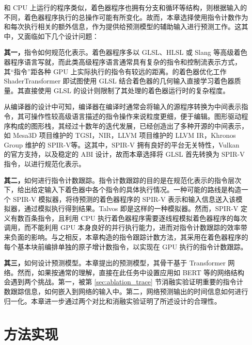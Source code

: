 {\amend 和 CPU 上运行的程序类似，着色器程序也拥有分支和循环等结构，则根据输入的不同，着色器程序执行的总操作可能有所变化。故而，本章选择使用指令计数作为和每次执行相关的额外信息，作为提供给预测模型的辅助输入进行预测工作。这其中，又面临如下几个设计问题：

{\bf 其一，}指令如何规范化表示。着色器程序多以 GLSL、HLSL 或 Slang 等高级着色器程序语言写就，而此类高级程序语言通常具有复杂的指令和控制流表示方式，其“指令”距各种 GPU 上实际执行的指令有较远的距离。\citet{10.1145/3528233.3530722}的着色器优化工作 ShaderTransformer 即试图使用 GLSL 结合着色器的几何输入直接学习着色器质量。其直接使用 GLSL 的设计则限制了其处理的着色器运行时的复杂程度。

从编译器的设计中可知，编译器在编译时通常会将输入的源程序转换为中间表示指令，其可操作性较高级语言描述的指令操作来说粒度更细，便于编辑。图形驱动程序构成的图形栈，其经过十数年的迭代发展，已经创造出了多种开源的中间表示，如 Mesa3D 项目维护的 TGSI\cite{TGSI}，NIR\cite{NIR}，LLVM 项目维护的 LLVM IR\cite{LLVMIR}，Khronos Group 维护的 SPIR-V\cite{SPIRV}等。这其中，SPIR-V 拥有良好的平台无关特性，Vulkan 的官方支持，以及稳定的 ABI 设计，故而本章选择将 GLSL 首先转换为 SPIR-V 指令，以进行规范化表示。

{\bf 其二，}如何进行指令计数跟踪。指令计数跟踪的目的是在规范化表示的指令层次下，给出给定输入下着色器中各个指令的具体执行情况。一种可能的路线是构造一个 SPIR-V 模拟器，将待预测的着色器程序的 SPIR-V 表示和输入信息送入该模拟器，通过模拟执行得到结果。Talvos \cite{Talvos}即是这样的一种模拟器。然而，SPIR-V 定义有数百条指令，且利用 CPU 执行着色器程序需要逐线程模拟着色器程序的每次调用，而不能利用 GPU 本身良好的并行执行能力，进而对指令计数跟踪的效率带来负面的影响。与之相反，本章构造的指令跟踪计数方法，其采用在着色器程序的每个基本块前编排单独的原子增计数指令，以实现在 GPU 执行的指令计数跟踪。

{\bf 其三，}如何设计预测模型。本章提出的预测模型，其骨干基于 Transformer 网络。然而，如果按通常的理解，直接在此任务中设置应用如 BERT 等的网络结构会遇到两个挑战。第一，被第 \ref{sec:ablation_trace} 节消融实验证明重要的指令计数跟踪信息，如何嵌入到网络的输入中。第二，网络预测输出的时间信息如何进行归一化。本章进一步通过两个对比和消融实验证明了所述设计的合理性。

}

\section{{\amend 方法实现}}

